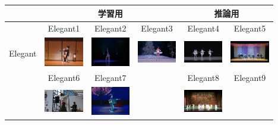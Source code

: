 \begin{table}[t]
  \begin{center}
    \begin{tabular}{|c|ccc|cc|} \hline
        & \multicolumn{3}{|c|}{学習用} & \multicolumn{2}{|c|}{推論用} \\ \hline
        & Elegant1\cite{jpn} & Elegant2\cite{china} & Elegant3\cite{ballet} & Elegant4\cite{balletgroup} & Elegant5\cite{jpngroup}
      \\
      Elegant
        & \includegraphics[width=17mm]{images/snaps/japanese_elegant.png}
        & \includegraphics[width=17mm]{images/snaps/chinese_elegant.png}
        & \includegraphics[width=17mm]{images/snaps/ballet_elegant.png}
        & \includegraphics[width=17mm]{images/snaps/ballet_group_elegant.png}
        & \includegraphics[width=17mm]{images/snaps/japanese_group_elegant.png}
      \\
      & Elegant6\cite{thai} & Elegant7\cite{jpn2} & & Elegant8\cite{chinagroup} & Elegant9\cite{belly}
      \\
        & \includegraphics[width=17mm]{images/snaps/thai_elegant.png}
        & \includegraphics[width=17mm]{images/snaps/japanese2_elegant.png}
        &
        & \includegraphics[width=17mm]{images/snaps/chinese_group_elegant.png}

\end{tabular}
\end{center}
\end{table}
